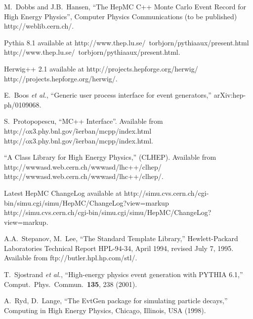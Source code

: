 \documentclass[11pt,letterpaper]{article}
\begin{document}
%
%

\begin{thebibliography}{99}

  M.~Dobbs and J.B.~Hansen, ``The HepMC C++ Monte Carlo Event Record for
  High Energy Physics'', Computer Physics Communications (to be
  published) 
  {http://weblib.cern.ch/}.  

  Pythia 8.1 available at \htmladdnormallink
  {http://www.thep.lu.se/~torbjorn/pythiaaux/present.html}
  {http://www.thep.lu.se/~torbjorn/pythiaaux/present.html}.

  Herwig++ 2.1 available at \htmladdnormallink
  {http://projects.hepforge.org/herwig/}
  {http://projects.hepforge.org/herwig/}.

E.~Boos {\it et al.},
``Generic user process interface for event generators,''
arXiv:hep-ph/0109068.

  S.~Protopopescu, ``MC++ Interface''.
  Available from \htmladdnormallink
  {http://ox3.phy.bnl.gov/\~serban/mcpp/index.html}
  {http://ox3.phy.bnl.gov/\~serban/mcpp/index.html}.

  ``A Class Library for High Energy Physics,'' (CLHEP).
  Available from 
  \htmladdnormallink
  {http://wwwasd.web.cern.ch/wwwasd/lhc++/clhep/}
  {http://wwwasd.web.cern.ch/wwwasd/lhc++/clhep/}.

  Latest HepMC ChangeLog available at  \htmladdnormallink
  {http://simu.cvs.cern.ch/cgi-bin/simu.cgi/simu/HepMC/ChangeLog?view=markup}
  {http://simu.cvs.cern.ch/cgi-bin/simu.cgi/simu/HepMC/ChangeLog?view=markup}.

  A.A.~Stepanov, M.~Lee, ``The Standard Template Library,''
  Hewlett-Packard Laboratories Technical Report HPL-94-34, April 1994,
  revised July 7, 1995.
  Available from 
  {ftp://butler.hpl.hp.com/stl/}.

  T.~Sjostrand {\it et al.}, 
  ``High-energy physics event generation with PYTHIA 6.1,''
  Comput.\ Phys.\ Commun.\  {\bf 135}, 238 (2001).

  A.~Ryd, D.~Lange,
  ``The EvtGen package for simulating particle decays,''
  Computing in High Energy Physics, Chicago, Illinois, USA (1998).


\end{thebibliography}
\end{document}
